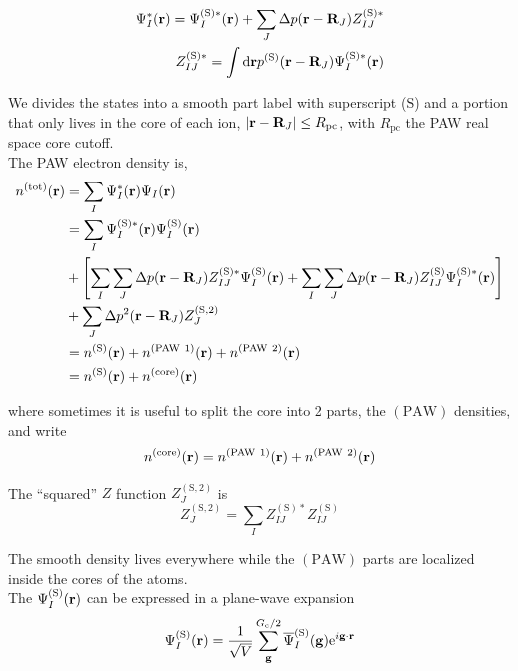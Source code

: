 \documentclass[paper=a4, fontsize=11pt]{article} %
\numberwithin{equation}{section} %
\numberwithin{figure}{section} %
\numberwithin{table}{section} %
\newcommand{\bg}{{\bf{g}}}
\newcommand{\br}{{\bf{r}}}
\newcommand{\bR}{{\bf{R}}}
\newcommand{\rS}{{\mathrm{S}}}
\newcommand{\rcore}{{\mathrm{core}}}
\newcommand{\re}{{\mathrm{e}}}
\newcommand{\rP}{{\mathrm{PAW}}}
\newcommand{\rd}{{\mathrm{d}}}
\newcommand{\rtot}{{\mathrm{tot}}}
\newcommand{\ibgr}{i\bg\cdot\br}
\newcommand{\Gc}{{G_{\mathrm{c}}}}
\newcommand{\Rpc}{{R_{\mathrm{pc}}}}
\begin{document}
\begin{equation}
\begin{split}
\Psi_I^*(\br) = \Psi_I^{(\rS)*}(\br)+\sum_J \Delta p(\br-\bR_J)Z_{IJ}^{(\rS)*} \\
Z_{IJ}^{(\rS)*} = \int \rd\br p^{(\rS)}(\br-\bR_J)\Psi_I^{(\rS)*}(\br) \\ 
\end{split}
\end{equation}

We divides the states into a smooth part label with superscript ($\rS$) and a portion that only lives in the core of each ion, $|\br-\bR_J| \leq \Rpc$, with $\Rpc$ the PAW real space core cutoff.\\

The PAW electron density is,
\begin{equation}\label{eq:densityPAW}
\begin{split}
n^{(\rtot)}(\br) &= \sum_I \Psi_I^*(\br)\Psi_I(\br) \\
&= \sum_I \Psi_I^{(\rS)*}(\br)\Psi_I^{(\rS)}(\br) \\
&+ \left[\sum_I \sum_J \Delta p(\br-\bR_J) Z_{IJ}^{(\rS)*} \Psi_I^{(\rS)}(\br) + \sum_I \sum_J \Delta p(\br-\bR_J) Z_{IJ}^{(\rS)} \Psi_I^{(\rS)*}(\br) \right]\\
&+ \sum_J \Delta p^2(\br-\bR_J) Z_{J}^{(\rS,2)} \\
&= n^{(\rS)}(\br) + n^{(\rP\ 1)}(\br) + n^{(\rP\ 2)}(\br)\\
&= n^{(\rS)}(\br) + n^{(\rcore)}(\br)
\end{split}
\end{equation}

where sometimes it is useful to split the core into 2 parts, the $(\rP)$ densities, and write
\begin{equation}
n^{(\rcore)}(\br) = n^{(\rP\ 1)}(\br) + n^{(\rP\ 2)}(\br)
\end{equation}

The ``squared'' $Z$ function $Z_{J}^{(\rS,2)}$ is
\begin{equation}
Z_{J}^{(\rS,2)} = \sum_I Z_{IJ}^{(\rS)*}Z_{IJ}^{(\rS)}
\end{equation}

The smooth density lives everywhere while the $(\rP)$ parts are localized inside the cores of the atoms.\\

The $\Psi_I^{(\rS)}(\br)$ can be expressed in a plane-wave expansion
\begin{equation}\label{eq:wfg}
\Psi_I^{(\rS)}(\br) =\frac{1}{\sqrt{V}}\sum_\bg^{\Gc/2} \overline{\Psi}^{(\rS)}_I(\bg)  \re^{\ibgr} 
\end{equation}
\end{document}
